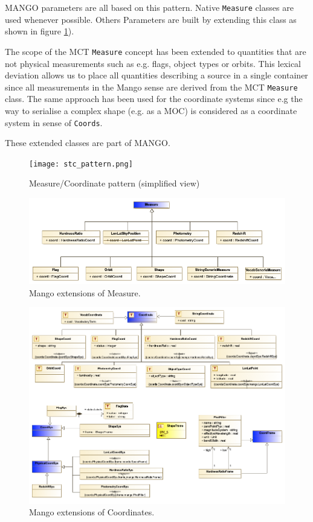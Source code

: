 \documentclass[11pt,a4paper]{ivoa}
\begin{document}
MANGO parameters are all based on this pattern. 
Native  \texttt{Measure} classes are used whenever possible. 
Others Parameters are built by extending this class as shown in figure \ref{fig:stcpattern}). 

The scope of the MCT \texttt{Measure}  concept has been extended to quantities that are not physical measurements such as e.g. flags, object types or orbits. 
This lexical deviation allows us to place all quantities describing a source in a single container since all measurements in the Mango sense are derived from the MCT \texttt{Measure} class.
The same approach has been used for the coordinate systems since e.g the way to serialise a complex shape (e.g. as a MOC) is considered as a coordinate system in sense of \texttt{Coords}.

These extended classes are part of MANGO.
\begin{figure}
     \texttt{[image: stc\_pattern.png]}
     \caption{Measure/Coordinate pattern (simplified view)}
     \label{fig:stcpattern}
\end{figure}

\begin{figure}
  \includegraphics[width=1.0\textwidth]{../model/mangoMeasures.png}
  \caption{Mango extensions of Measure.}
  \label{fig:measures}
\end{figure}

\begin{figure}
  \includegraphics[width=1.0\textwidth]{../model/mangoCoordinates.png}
  \caption{Mango extensions of Coordinates.}
  \label{fig:coordinates}
\end{figure}
\end{document}
